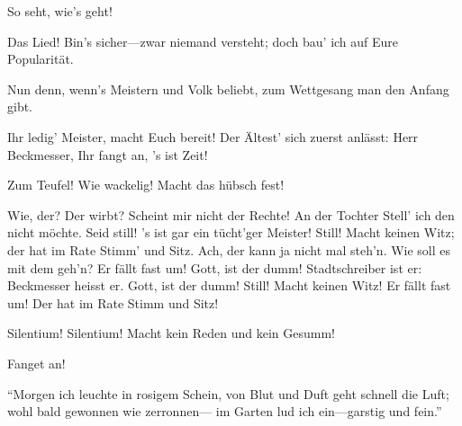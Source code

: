 \begin{drama}
\Sachsspeaks
So seht, wie's geht!

\Beckmesserspeaks
Das Lied! Bin's sicher---zwar niemand versteht;
doch bau' ich auf Eure Popularität.

\Sachsspeaks
Nun denn, wenn's Meistern und Volk beliebt,
zum Wettgesang man den Anfang gibt.

\Kothnerspeaks


Ihr ledig' Meister, macht Euch bereit!
Der Ältest' sich zuerst anlässt:
Herr Beckmesser, Ihr fangt an, 's ist Zeit!




\Beckmesserspeaks


Zum Teufel! Wie wackelig! Macht das hübsch fest!






Wie, der? Der wirbt? Scheint mir nicht der Rechte!
An der Tochter Stell' ich den nicht möchte.
Seid still! 's ist gar ein tücht'ger Meister!
Still! Macht keinen Witz;
der hat im Rate Stimm' und Sitz.
Ach, der kann ja nicht mal steh'n.
Wie soll es mit dem geh'n?
Er fällt fast um! Gott, ist der dumm!
Stadtschreiber ist er:
Beckmesser heisst er.
Gott, ist der dumm!
Still! Macht keinen Witz!
Er fällt fast um!
Der hat im Rate Stimm und Sitz!





Silentium! Silentium!
Macht kein Reden und kein Gesumm!

\Kothnerspeaks
Fanget an!

\Beckmesserspeaks


``Morgen ich leuchte in rosigem Schein,
von Blut und Duft geht schnell die Luft;
wohl bald gewonnen wie zerronnen---
im Garten lud ich ein---garstig und fein.''



\end{drama}
